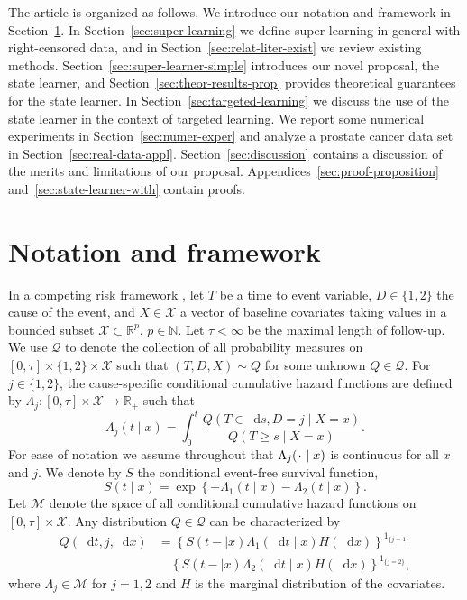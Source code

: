 \documentclass{statsoc}
\numberwithin{theorem}{section}
\newcommand{\R}{\mathbb{R}}
\newcommand{\N}{\mathbb{N}}
\newcommand{\blank}{\makebox[1ex]{\textbf{$\cdot$}}}
\newcommand*\diff{\mathop{}\!\mathrm{d}}
\newcommand{\1}{\mathds{1}}
\begin{document}
The article is organized as follows. We introduce our notation and framework in
Section~\ref{sec:framework}. In Section~\ref{sec:super-learning} we define super
learning in general with right-censored data, and in
Section~\ref{sec:relat-liter-exist} we review existing methods.
Section~\ref{sec:super-learner-simple} introduces our novel proposal, the state
learner, and Section~\ref{sec:theor-results-prop} provides theoretical
guarantees for the state learner. In Section~\ref{sec:targeted-learning} we
discuss the use of the state learner in the context of targeted learning. We
report some numerical experiments in Section~\ref{sec:numer-exper} and analyze a
prostate cancer data set in Section~\ref{sec:real-data-appl}.
Section~\ref{sec:discussion} contains a discussion of the merits and limitations
of our proposal. Appendices~\ref{sec:proof-proposition}
and~\ref{sec:state-learner-with} contain proofs.


\section{Notation and framework}
\label{sec:framework}

In a competing risk framework \citep{andersen2012statistical}, let \( T\) be a
time to event variable, \(D\in\{1,2\}\) the cause of the event, and
$X \in \mathcal{X}$ a vector of baseline covariates taking values in a bounded
subset \( \mathcal{X} \subset \R^p \), \( p\in\N \). Let $\tau< \infty$ be the
maximal length of follow-up. We use \( \mathcal{Q} \) to denote the collection
of all probability measures on \( [0,\tau] \times \{1,2\}\times \mathcal{X} \)
such that \( (T, D, X) \sim Q \) for some unknown \( Q \in \mathcal{Q} \). For
\(j\in\{1,2\}\), the cause-specific conditional cumulative hazard functions are
defined by
\( \Lambda_{j} \colon [0, \tau] \times \mathcal{X} \rightarrow \R_+ \) such that
\begin{equation*}
  \Lambda_{j}(t \mid x) = \int_0^t\frac{  Q(T \in \diff s, D=j \mid X=x )}{Q(T \geq s \mid X=x )}.
\end{equation*}
For ease of notation we assume throughout that \( \Lambda_j(\blank \mid x) \) is
continuous for all \( x \) and \( j \). We denote by \(S\) the conditional
event-free survival function,
\begin{equation}
  \label{eq:surv-def}
  S(t \mid x)=\exp\left\{-\Lambda_{1}(t \mid x)-\Lambda_{2}(t \mid x)\right\}.
\end{equation}
Let \( \mathcal{M} \) denote the space of all conditional cumulative hazard
functions on \( [0,\tau] \times\mathcal{X}\). Any distribution
\( Q \in \mathcal{Q} \) can be characterized by
\begin{equation*}
  \label{eq:parametrizeQ}
  \begin{split}
    Q(\diff t,j,\diff x)&= \left\{S(t- \mid x)\Lambda_1(\diff t \mid x)H(\diff x)\right\}^{1_{\{j=1\}}}\\
                        &\quad\left\{S(t- \mid x)\Lambda_2(\diff t \mid x)H(\diff x)\right\}^{1_{\{j=2\}}},
  \end{split}
\end{equation*}
where \(\Lambda_{j} \in \mathcal{M}\) for \(j=1,2\) and \(H\) is the marginal
distribution of the covariates.
\end{document}
